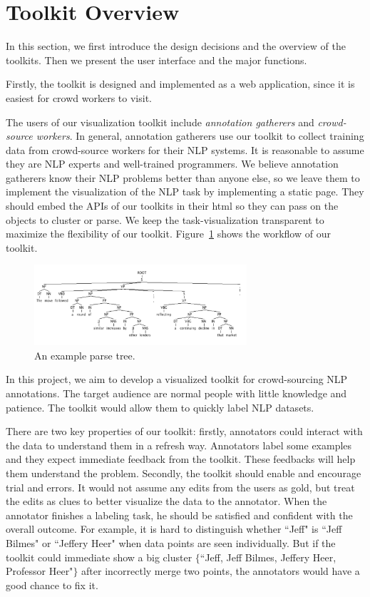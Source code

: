 \section{Toolkit Overview}
In this section, we first introduce the design decisions and the overview of the toolkits. Then we present the user interface and the major functions.

Firstly, the toolkit is designed and implemented as a web application, since it is easiest for crowd workers to visit.

The users of our visualization toolkit include {\em annotation gatherers} and {\em crowd-source workers}. In general, annotation gatherers use our toolkit to collect training data from crowd-source workers for their NLP systems. It is reasonable to assume they are NLP experts and well-trained programmers. We believe annotation gatherers know their NLP problems better than anyone else, so we leave them to implement the visualization of the NLP task by implementing a static page. They should embed the APIs of our toolkits in their html so they can pass on the objects to cluster or parse. We keep the task-visualization transparent to maximize the flexibility of our toolkit. Figure~\ref{fig:workflow} shows the workflow of our toolkit.

\begin{figure}
\centering
\includegraphics[width=3.1in]{figs/parsetree.png}
\caption{An example parse tree.}
\label{fig:workflow}
\end{figure}



In this project, we aim to develop a visualized toolkit for
crowd-sourcing NLP annotations. The target audience are normal people
with little knowledge and patience. The toolkit would allow them to
quickly label NLP datasets.

There are two key properties of our toolkit: firstly, annotators could
interact with the data to understand them in a refresh way. Annotators
label some examples and they expect immediate feedback from the
toolkit. These feedbacks will help them understand the problem.
Secondly, the toolkit should enable and encourage trial and errors. It
would not assume any edits from the users as gold, but treat the edits
as clues to better visualize the data to the annotator. When the
annotator finishes a labeling task, he should be satisfied and
confident with the overall outcome. For example, it is hard to
distinguish whether ``Jeff" is ``Jeff Bilmes" or ``Jeffery Heer" when
data points are seen individually. But if the toolkit could immediate
show a big cluster $\{$``Jeff, Jeff Bilmes, Jeffery Heer, Professor
Heer"$\}$ after incorrectly merge two points, the annotators would
have a good chance to fix it.

